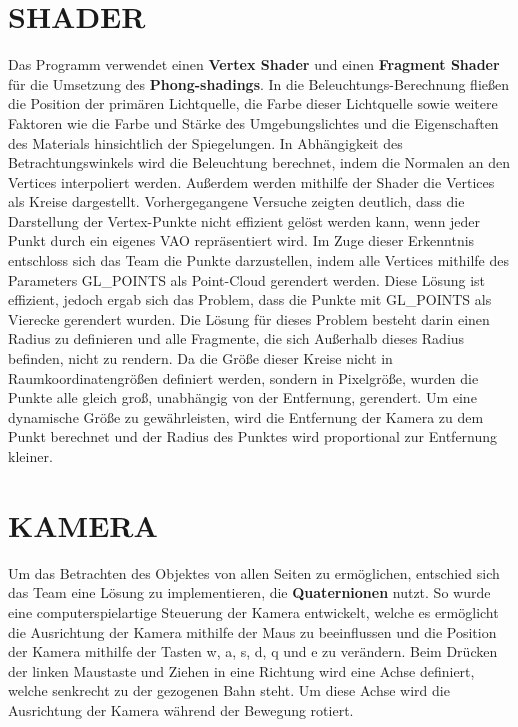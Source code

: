 \section{\Large SHADER}
Das Programm verwendet einen \textbf{Vertex Shader} und einen \textbf{Fragment Shader} für die Umsetzung des \textbf{Phong-shadings}. In die Beleuchtungs-Berechnung fließen die Position der primären Lichtquelle, die Farbe dieser Lichtquelle sowie weitere Faktoren wie die Farbe und Stärke des Umgebungslichtes und die Eigenschaften des Materials hinsichtlich der Spiegelungen. In Abhängigkeit des Betrachtungswinkels wird die Beleuchtung berechnet, indem die Normalen an den Vertices interpoliert werden. Außerdem werden mithilfe der Shader die Vertices als Kreise dargestellt.\newline\newline
Vorhergegangene Versuche zeigten deutlich, dass die Darstellung der Vertex-Punkte nicht effizient gelöst werden kann, wenn jeder Punkt durch ein eigenes VAO repräsentiert wird. Im Zuge dieser Erkenntnis entschloss sich das Team die Punkte darzustellen, indem alle Vertices mithilfe des Parameters GL\_POINTS als Point-Cloud gerendert werden. Diese Lösung ist effizient, jedoch ergab sich das Problem, dass die Punkte mit GL\_POINTS als Vierecke gerendert wurden. Die Lösung für dieses Problem besteht darin einen Radius zu definieren und alle Fragmente, die sich Außerhalb dieses Radius befinden, nicht zu rendern. Da die Größe dieser Kreise nicht in Raumkoordinatengrößen definiert werden, sondern in Pixelgröße, wurden die Punkte alle gleich groß, unabhängig von der Entfernung, gerendert. Um eine dynamische Größe zu gewährleisten, wird die Entfernung der Kamera zu dem Punkt berechnet und der Radius des Punktes wird proportional zur Entfernung kleiner.

\section{\Large KAMERA}
Um das Betrachten des Objektes von allen Seiten zu ermöglichen, entschied sich das Team eine Lösung zu implementieren, die \textbf{Quaternionen} nutzt. So wurde eine computerspielartige Steuerung der Kamera entwickelt, welche es ermöglicht die Ausrichtung der Kamera mithilfe der Maus zu beeinflussen und die Position der Kamera mithilfe der Tasten w, a, s, d, q und e zu verändern. Beim Drücken der linken Maustaste und Ziehen in eine Richtung wird eine Achse definiert, welche senkrecht zu der gezogenen Bahn steht. Um diese Achse wird die Ausrichtung der Kamera während der Bewegung rotiert.

